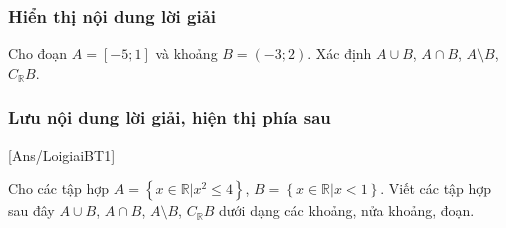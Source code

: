 \documentclass[Main.tex]{subfiles}
\begin{document}
	\subsubsection{Hiển thị nội dung lời giải}
	\hienthiloigiaibt
	\begin{bt}%
		Cho đoạn $A=[-5;1]$ và khoảng $B=(-3;2)$. Xác định $A\cup B$, $A\cap B$, $A\setminus B$, $C_{\mathbb{R}}B$.
		\loigiai{
			Ta có
			\begin{itemize}
				\item $A\cup B=[-5;2)$.
				\item $A\cap B=(-3;1]$.
				\item $A\setminus B=[-5;-3]$.
				\item $C_{\mathbb{R}}B=\mathbb{R}\setminus B=(-\infty;-3]\cup [2;+\infty)$.
			\end{itemize} 
		}
	\end{bt}
	
	\subsubsection{Lưu nội dung lời giải, hiện thị phía sau}
	\luuloigiaibt
	[Ans/LoigiaiBT1]
	\begin{bt}%
		Cho các tập hợp $A=\left\{x\in \mathbb{R}\big|x^2\leqslant 4\right\}$, $B=\left\{x\in \mathbb{R}\big|x<1\right\}$. Viết các tập hợp sau đây $A\cup B$, $A\cap B$, $A\setminus B$, $ C_{\mathbb{R}}B$ dưới dạng các khoảng, nửa khoảng, đoạn.
		\loigiai{
			Ta có $A=[-2;2]$ và $B=(-\infty;1)$, suy ra
			\begin{itemize}
				\item $A\cup B=[-2;2]\cup (-\infty;1)=(-\infty;2]$.
				\item $A\cap B=[-2;2]\cap (-\infty;1)=[-2;1)$.
				\item $A\setminus B=[-2;2]\setminus (-\infty;1)=[1;2]$.
				\item $C_{\mathbb{R}}B=[1;+\infty)$.
			\end{itemize}
		}
	\end{bt}
	
\end{document}
